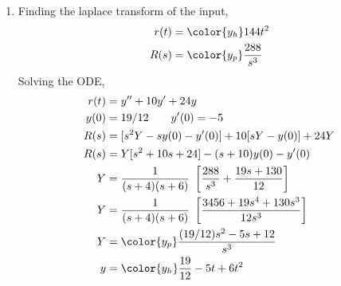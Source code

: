 \begin{enumerate}
    \item Finding the laplace transform of the input,
          \begin{align}
              r(t) & = \color{y_h}144t^2           \\
              R(s) & = \color{y_p} \frac{288}{s^3}
          \end{align}
          Solving the ODE,
          \begin{align}
              r(t) & = y'' + 10y'  + 24y                                         \\
              y(0) & = 19/12 \qquad y'(0) = -5                                   \\
              R(s) & = [s^2Y - sy(0) - y'(0)] + 10[sY - y(0)] + 24Y              \\
              R(s) & = Y[s^2 + 10s + 24] - (s + 10) y(0) - y'(0)                 \\
              Y    & = \frac{1}{(s+4)(s+6)}\ \left[ \frac{288}{s^3}
              + \frac{19s+130}{12}\right]                                        \\
              Y    & = \frac{1}{(s+4)(s+6)}\ \left[ \frac{3456 + 19s^4 + 130s^3}
              {12s^3}\right]                                                     \\
              Y    & = \color{y_p} \frac{(19/12)s^2 - 5s + 12}{s^3}              \\
              y    & = \color{y_h} \frac{19}{12} - 5t + 6t^2
          \end{align}


\end{enumerate}
